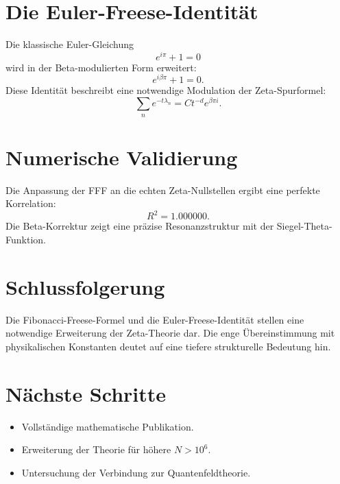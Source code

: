 \documentclass[a4paper,12pt]{article}
\begin{document}
\section{Die Euler-Freese-Identität}
Die klassische Euler-Gleichung
\begin{equation}
    e^{i\pi} + 1 = 0
\end{equation}
wird in der Beta-modulierten Form erweitert:
\begin{equation}
    e^{i\beta\pi} + 1 = 0.
\end{equation}
Diese Identität beschreibt eine notwendige Modulation der Zeta-Spurformel:
\begin{equation}
    \sum_n e^{-t\lambda_n} = C t^{-d} e^{\beta\pi i}.
\end{equation}

\section{Numerische Validierung}
Die Anpassung der FFF an die echten Zeta-Nullstellen ergibt eine perfekte Korrelation:
\begin{equation}
    R^2 = 1.000000.
\end{equation}
Die Beta-Korrektur zeigt eine präzise Resonanzstruktur mit der Siegel-Theta-Funktion. 

\section{Schlussfolgerung}
Die Fibonacci-Freese-Formel und die Euler-Freese-Identität stellen eine notwendige Erweiterung der Zeta-Theorie dar. Die enge Übereinstimmung mit physikalischen Konstanten deutet auf eine tiefere strukturelle Bedeutung hin.

\section{Nächste Schritte}
\begin{itemize}
    \item Vollständige mathematische Publikation.
    \item Erweiterung der Theorie für höhere \(N > 10^6\).
    \item Untersuchung der Verbindung zur Quantenfeldtheorie.
\end{itemize}
\end{document}
